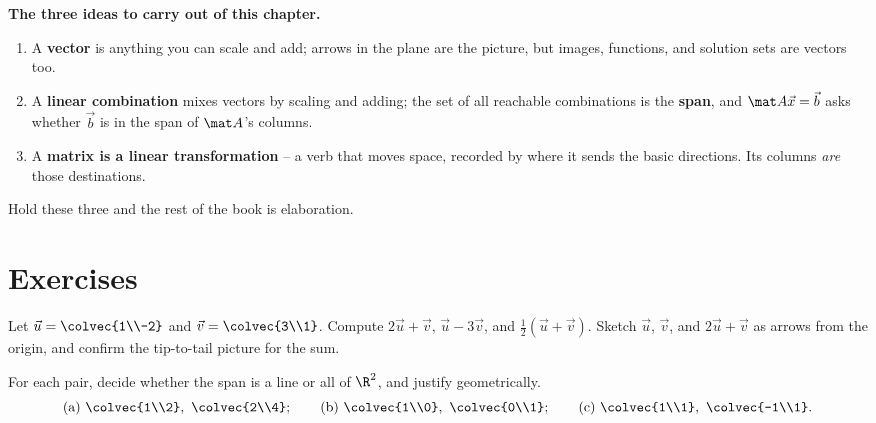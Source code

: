 \begin{focusbox}
\textbf{The three ideas to carry out of this chapter.}
\begin{enumerate}
  \item A \textbf{vector} is anything you can scale and add; arrows in the plane are the picture, but
  images, functions, and solution sets are vectors too.
  \item A \textbf{linear combination} mixes vectors by scaling and adding; the set of all reachable
  combinations is the \textbf{span}, and $\mat A\vec x=\vec b$ asks whether $\vec b$ is in the span of
  $\mat A$'s columns.
  \item A \textbf{matrix is a linear transformation} -- a verb that moves space, recorded by where it
  sends the basic directions. Its columns \emph{are} those destinations.
\end{enumerate}
Hold these three and the rest of the book is elaboration.
\end{focusbox}

\section{Exercises}

\begin{exercise}
Let $\vec u = \colvec{1\\-2}$ and $\vec v = \colvec{3\\1}$. Compute $2\vec u + \vec v$,
$\vec u - 3\vec v$, and $\tfrac12(\vec u + \vec v)$. Sketch $\vec u$, $\vec v$, and $2\vec u + \vec v$
as arrows from the origin, and confirm the tip-to-tail picture for the sum.
\end{exercise}

\begin{exercise}
For each pair, decide whether the span is a line or all of $\R^2$, and justify geometrically.
\[
\text{(a) } \colvec{1\\2},\ \colvec{2\\4};\qquad
\text{(b) } \colvec{1\\0},\ \colvec{0\\1};\qquad
\text{(c) } \colvec{1\\1},\ \colvec{-1\\1}.
\]
\end{exercise}

